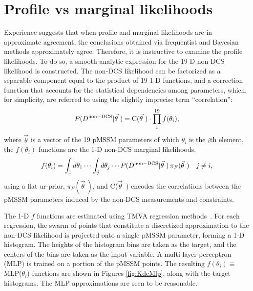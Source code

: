 \section{Profile vs marginal likelihoods}
\label{sec:freqcheck}
Experience suggests that when profile and marginal likelihoods are in approximate agreement, the conclusions obtained via frequentist and Bayesian methods approximately agree. Therefore, it is
instructive to examine the profile likelihoods. To do so, 
a smooth analytic expression for the 19-D non-DCS likelihood is constructed. The non-DCS likelihood can be factorized as a separable component equal to the product of 19 1-D functions, and a correction function that accounts for the statistical dependencies among parameters, which, for simplicity, are referred to using the slightly imprecise term ``correlation'':
\begin{equation}
P(D^{\rm non-DCS}|\vec{\theta}\ ) = {\rm C}(\vec{\theta}\ ) \cdot \prod_{i}^{19}f(\theta_{i}),
\label{eq:Likelihood}
\end{equation}
where $\vec{\theta}$ is a vector of the 19 pMSSM parameters of which $\theta_i$ is the $i$th element, the $f(\theta_{i})$ functions are the 1-D non-DCS marginal likelihoods,
\begin{equation}
f(\theta_i) = \int_1 d\theta_1 \cdots \int_j d\theta_j \cdots P(D^{\rm non-DCS}|\vec{\theta}\ ) \, \pi_F(\vec{\theta}\ ) \quad j \neq i,
\end{equation}
 using a flat ur-prior, $\pi_F(\vec{\theta}\ )$, and C($\vec{\theta}$\ ) encodes the correlations between the pMSSM parameters induced by the non-DCS measurements and constraints. 

The 1-D $f$ functions are estimated using TMVA regression methods~\cite{Hocker:2007ht}. For each regression, the swarm of points that constitute a discretized approximation to the non-DCS likelihood is projected onto a single pMSSM parameter, forming a 1-D histogram. The heights of the histogram bins are taken as the target, and the centers of the bins are taken as the input variable. A multi-layer perceptron (MLP)\cite{Hocker:2007ht} is trained on a portion of the pMSSM points.
The resulting $f(\theta_i) \equiv$ MLP($\theta_i$) functions are shown in Figures \ref{fig:KdeMlp}, along with the target histograms. The MLP approximations are seen to be reasonable.

